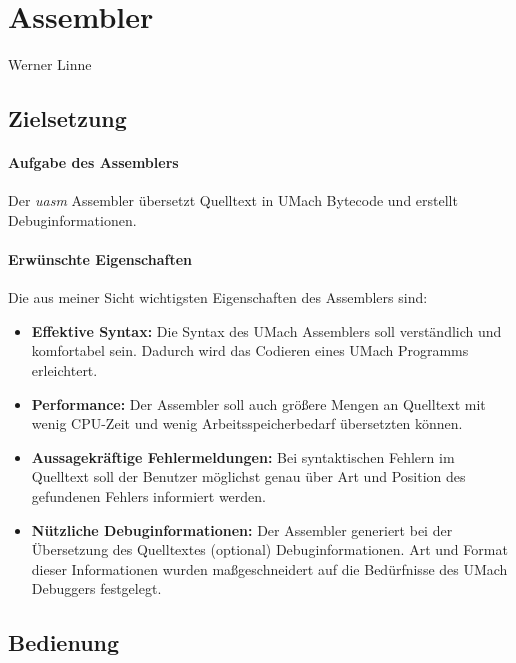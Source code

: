 \section{Assembler}
\begin{flushright}
Werner Linne
\end{flushright}

\subsection{Zielsetzung}

\paragraph{Aufgabe des Assemblers}

Der \emph{uasm} Assembler übersetzt Quelltext in UMach Bytecode und erstellt
Debuginformationen.

\paragraph{Erwünschte Eigenschaften}

Die aus meiner Sicht wichtigsten Eigenschaften des Assemblers sind:
\begin{itemize}
\item \textbf{Effektive Syntax:} Die Syntax des UMach Assemblers soll verständlich
und komfortabel sein. Dadurch wird das Codieren eines UMach Programms erleichtert.

\item \textbf{Performance:} Der Assembler soll auch größere Mengen an Quelltext
mit wenig CPU-Zeit und wenig Arbeitsspeicherbedarf übersetzten können.

\item \textbf{Aussagekräftige Fehlermeldungen:} Bei syntaktischen Fehlern im
Quelltext soll der Benutzer möglichst genau über Art und Position des gefundenen
Fehlers informiert werden.

\item \textbf{Nützliche Debuginformationen:} Der Assembler generiert bei der
Übersetzung des Quelltextes (optional) Debuginformationen. Art und Format dieser
Informationen wurden maßgeschneidert auf die Bedürfnisse des UMach Debuggers
festgelegt.
\end{itemize}

\subsection{Bedienung}

